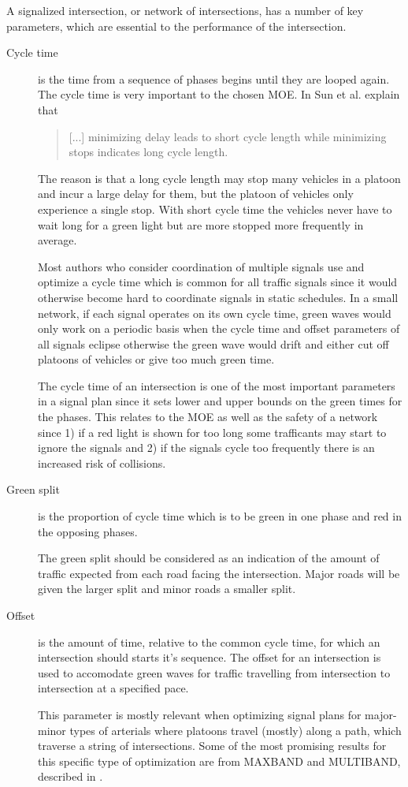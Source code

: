 \label{theproblem}

A signalized intersection, or network of intersections, has a number of key parameters, which are essential to the performance of the intersection.

\begin{description}
\item[Cycle time] is the time from a sequence of phases begins until they are looped again. The cycle time is very important to the chosen MOE. In \cite{41} Sun et al. explain that 

\begin{quote}[...] minimizing delay leads to short cycle length while minimizing stops indicates long cycle length.
\end{quote}

The reason is that a long cycle length may stop many vehicles in a platoon and incur a large delay for them, but the platoon of vehicles only experience a single stop. With short cycle time the vehicles never have to wait long for a green light but are more stopped more frequently in average.

Most authors who consider coordination of multiple signals use and optimize a cycle time which is common for all traffic signals since it would otherwise become hard to coordinate signals in static schedules. In a small network, if each signal operates on its own cycle time, green waves would only work on a periodic basis when the cycle time and offset parameters of all signals eclipse otherwise the green wave would drift and either cut off platoons of vehicles or give too much green time.

The cycle time of an intersection is one of the most important parameters in a signal plan since it sets  lower and upper bounds on the green times for the phases. This relates to the MOE as well as the safety of a network since 1) if a red light is shown for too long some trafficants may start to ignore the signals and 2) if the signals cycle too frequently there is an increased risk of collisions.

\item[Green split]  is the proportion of cycle time which is to be green in one phase and red in the opposing phases. 

The green split should be considered as an indication of the amount of traffic expected from each road facing the intersection. Major roads will be given the larger split and minor roads a smaller split.

\item[Offset] is the amount of time, relative to the common cycle time, for which an intersection should starts it's sequence. The offset for an intersection is used to accomodate green waves for traffic travelling from intersection to intersection at a specified pace.

This parameter is mostly relevant when optimizing signal plans for major-minor types of arterials where platoons travel (mostly) along a path, which traverse a string of intersections. Some of the most promising results for this specific type of optimization are from MAXBAND and MULTIBAND, described in \cite{37}.

\end{description}

